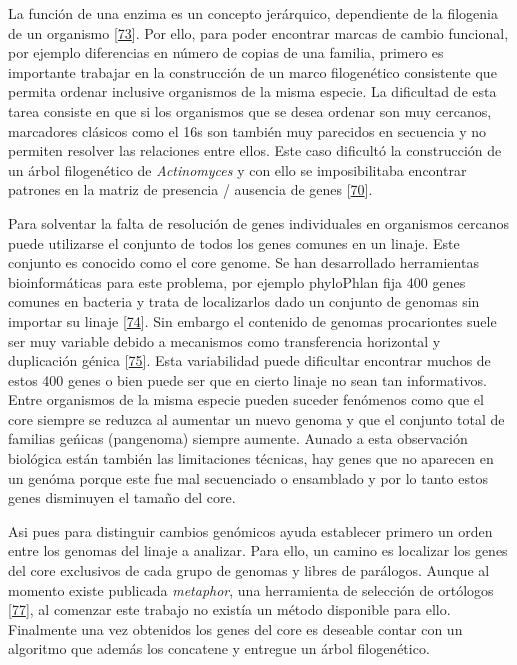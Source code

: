\documentclass[12pt,twoside]{reedthesis}
\begin{document}
  La función de una enzima es un concepto jerárquico, dependiente de la
  filogenia de un organismo
  {[}\protect\hyperlink{ref-szklarczyk_string_2015}{73}{]}. Por ello, para
  poder encontrar marcas de cambio funcional, por ejemplo diferencias en
  número de copias de una familia, primero es importante trabajar en la
  construcción de un marco filogenético consistente que permita ordenar
  inclusive organismos de la misma especie. La dificultad de esta tarea
  consiste en que si los organismos que se desea ordenar son muy cercanos,
  marcadores clásicos como el 16s son también muy parecidos en secuencia y
  no permiten resolver las relaciones entre ellos. Este caso dificultó la
  construcción de un árbol filogenético de \emph{Actinomyces} y con ello
  se imposibilitaba encontrar patrones en la matriz de presencia /
  ausencia de genes
  {[}\protect\hyperlink{ref-juarez-vazquez_evolution_2017}{70}{]}.
  
  Para solventar la falta de resolución de genes individuales en
  organismos cercanos puede utilizarse el conjunto de todos los genes
  comunes en un linaje. Este conjunto es conocido como el core genome. Se
  han desarrollado herramientas bioinformáticas para este problema, por
  ejemplo phyloPhlan fija 400 genes comunes en bacteria y trata de
  localizarlos dado un conjunto de genomas sin importar su linaje
  {[}\protect\hyperlink{ref-segata_phylophlan_2013}{74}{]}. Sin embargo el
  contenido de genomas procariontes suele ser muy variable debido a
  mecanismos como transferencia horizontal y duplicación génica
  {[}\protect\hyperlink{ref-land_insights_2015}{75}{]}. Esta variabilidad
  puede dificultar encontrar muchos de estos 400 genes o bien puede ser
  que en cierto linaje no sean tan informativos. Entre organismos de la
  misma especie pueden suceder fenómenos como que el core siempre se
  reduzca al aumentar un nuevo genoma y que el conjunto total de familias
  geńicas (pangenoma) siempre aumente. Aunado a esta observación biológica
  están también las limitaciones técnicas, hay genes que no aparecen en un
  genóma porque este fue mal secuenciado o ensamblado y por lo tanto estos
  genes disminuyen el tamaño del core.
  
  Asi pues para distinguir cambios genómicos ayuda establecer primero un
  orden entre los genomas del linaje a analizar. Para ello, un camino es
  localizar los genes del core exclusivos de cada grupo de genomas y
  libres de parálogos. Aunque al momento existe publicada \emph{metaphor},
  una herramienta de selección de ortólogos
  {[}\protect\hyperlink{ref-van_der_veen_metaphor_2014}{77}{]}, al
  comenzar este trabajo no existía un método disponible para ello.
  Finalmente una vez obtenidos los genes del core es deseable contar con
  un algoritmo que además los concatene y entregue un árbol filogenético.
  
\end{document}
